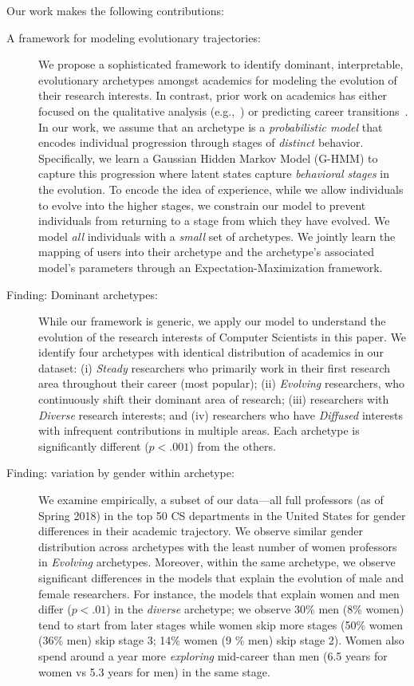 \documentclass[10pt,letterpaper]{article}
\begin{document}
\noindent
Our work makes the following contributions:
\begin{description}
\item[A framework for modeling evolutionary trajectories:] We propose a sophisticated framework to identify dominant, interpretable, evolutionary archetypes amongst academics for modeling the evolution of their research interests. In contrast, prior work on academics has either focused on the qualitative analysis (e.g.,~\cite{Ward:2001}) or predicting career transitions~\cite{Danai:2018}. In our work, we assume that an archetype is a \emph{probabilistic model} that encodes individual progression through stages of \emph{distinct} behavior. Specifically, we learn a Gaussian Hidden Markov Model (G-HMM) to capture this progression where latent states capture \emph{behavioral stages} in the evolution. To encode the idea of experience, while we allow individuals to evolve into the higher stages, we constrain our model to prevent individuals from returning to a stage from which they have evolved. We model \emph{all} individuals with a \emph{small} set of archetypes. We jointly learn the mapping of users into their archetype and the archetype's associated model's parameters through an Expectation-Maximization framework.
\item[Finding: Dominant archetypes:] While our framework is generic, we apply our model to understand the evolution of the research interests of Computer Scientists in this paper. We identify four archetypes with identical distribution of academics in our dataset: (i) \emph{Steady} researchers who primarily work in their first research area throughout their career (most popular); (ii) \emph{Evolving} researchers, who continuously shift their dominant area of research; (iii) researchers with \emph{Diverse} research interests; and (iv) researchers who have \emph{Diffused} interests with infrequent contributions in multiple areas. Each archetype is significantly different ($p< .001$) from the others.
\item[Finding: variation by gender within archetype:] We examine empirically, a subset of our data---all full professors (as of Spring 2018) in the top 50 CS departments in the United States for gender differences in their academic trajectory. We observe similar gender distribution across archetypes with the least number of women professors in \emph{Evolving} archetypes.
Moreover, within the same archetype, we observe significant differences in the models that explain the evolution of male and female researchers. For instance, the models that explain women and men differ ($p< .01$) in the \emph{diverse} archetype; we observe 30\% men (8\% women) tend to start from later stages while women skip more stages (50\% women (36\% men) skip stage 3; 14\% women (9 \% men) skip stage 2). Women also spend around a year more \emph{exploring} mid-career than men (6.5 years for women vs 5.3 years for men) in the same stage.

\end{description}
\end{document}
